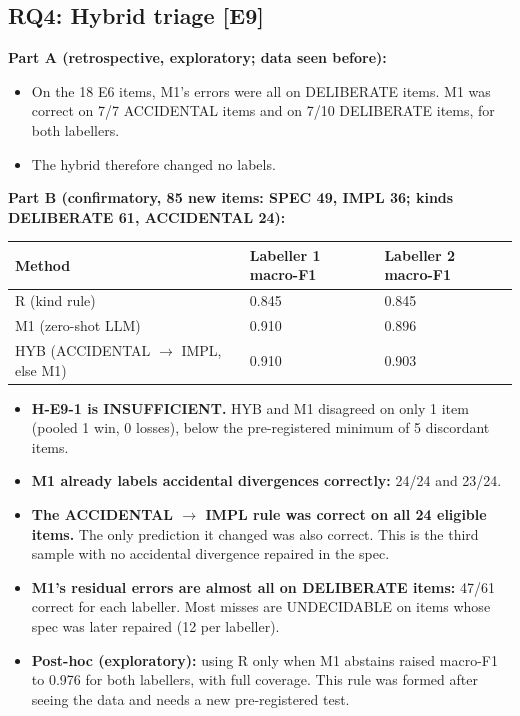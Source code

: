 \documentclass[acmsmall,screen,review,anonymous]{acmart}
\begin{document}
\subsection{RQ4: Hybrid triage [E9]}
\textbf{Part A (retrospective, exploratory; data seen before):}
\begin{itemize}
\item On the 18 E6 items, M1's errors were all on DELIBERATE items. M1 was correct on 7/7 ACCIDENTAL items and on 7/10 DELIBERATE items, for both labellers.
\item The hybrid therefore changed no labels.
\end{itemize}

\textbf{Part B (confirmatory, 85 new items: SPEC 49, IMPL 36; kinds DELIBERATE 61, ACCIDENTAL 24):}

\begin{table}[t]
\small
\begin{tabularx}{\linewidth}{lXX}
\toprule
Method & Labeller 1 macro-F1 & Labeller 2 macro-F1 \\
\midrule
R (kind rule) & 0.845 & 0.845 \\
M1 (zero-shot LLM) & 0.910 & 0.896 \\
HYB (ACCIDENTAL $\rightarrow$ IMPL, else M1) & 0.910 & 0.903 \\
\bottomrule
\end{tabularx}
\end{table}

\begin{itemize}
\item \textbf{H-E9-1 is INSUFFICIENT.} HYB and M1 disagreed on only 1 item (pooled 1 win, 0 losses), below the pre-registered minimum of 5 discordant items.
\item \textbf{M1 already labels accidental divergences correctly:} 24/24 and 23/24.
\item \textbf{The ACCIDENTAL $\rightarrow$ IMPL rule was correct on all 24 eligible items.} The only prediction it changed was also correct. This is the third sample with no accidental divergence repaired in the spec.
\item \textbf{M1's residual errors are almost all on DELIBERATE items:} 47/61 correct for each labeller. Most misses are UNDECIDABLE on items whose spec was later repaired (12 per labeller).
\item \textbf{Post-hoc (exploratory):} using R only when M1 abstains raised macro-F1 to 0.976 for both labellers, with full coverage. This rule was formed after seeing the data and needs a new pre-registered test.
\end{itemize}
\end{document}
